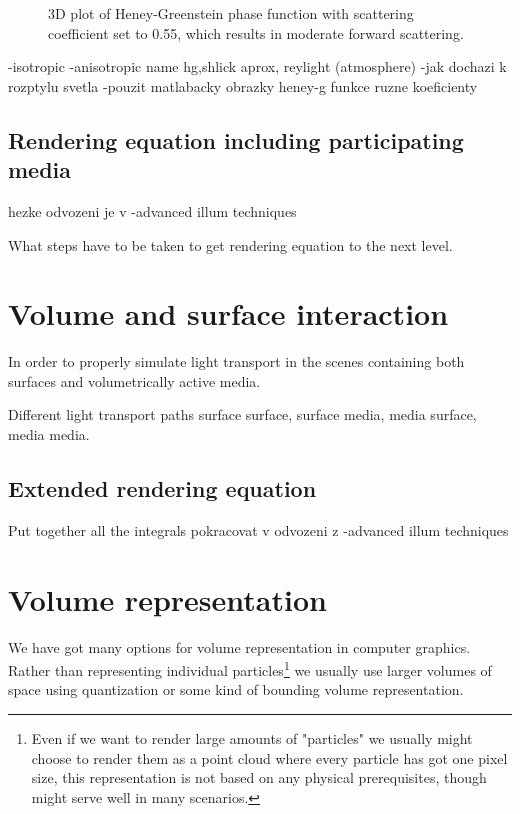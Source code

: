 \begin{minipage}{\linewidth}
\begin{minipage}{0.45\linewidth}
\begin{figure}[H]
              \captionsetup{width=\linewidth}
              \caption[3D plot Heney-Greenstein]{3D plot of Heney-Greenstein phase function with scattering coefficient set to 0.55, which results in moderate forward scattering. }\label{fig:HG3}
          \end{figure}
      \end{minipage}
  \end{minipage}




-isotropic
-anisotropic name hg,shlick aprox, reylight (atmosphere)
-jak dochazi k rozptylu svetla
-pouzit matlabacky obrazky heney-g funkce ruzne koeficienty

\subsection{Rendering equation including participating media}
hezke odvozeni je v -advanced illum techniques

What steps have to be taken to get rendering equation to the next level.

\section{Volume and surface interaction}
In order to properly simulate light transport in the scenes containing both surfaces and volumetrically active media.

Different light transport paths surface surface, surface media, media surface, media media.

\subsection{Extended rendering equation}
Put together all the integrals
pokracovat v odvozeni z -advanced illum techniques

\section{Volume representation}
We have got many options for volume representation in computer graphics. Rather than representing individual particles\footnote{Even if we want to render large amounts of "particles" we usually might choose to render them as a point cloud where every particle has got one pixel size, this representation is not based on any physical prerequisites, though might serve well in many scenarios.} we usually use larger volumes of space using quantization or some kind of bounding volume representation.

